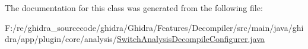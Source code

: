 The documentation for this class was generated from the following file\+:\begin{DoxyCompactItemize}
\item 
F\+:/re/ghidra\+\_\+sourcecode/ghidra/\+Ghidra/\+Features/\+Decompiler/src/main/java/ghidra/app/plugin/core/analysis/\mbox{\hyperlink{_switch_analysis_decompile_configurer_8java}{Switch\+Analysis\+Decompile\+Configurer.\+java}}\end{DoxyCompactItemize}
